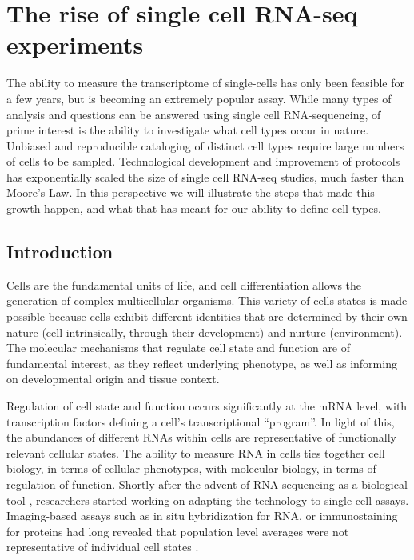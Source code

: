 
\chapter{The rise of single cell RNA-seq experiments}

\graphicspath{{Chapter1/Figs/}}

The ability to measure the transcriptome of single-cells has only been feasible for a few years, but is becoming an extremely popular assay. While many types of analysis and questions can be answered using single cell RNA-sequencing, of prime interest is the ability to investigate what cell types occur in nature. Unbiased and reproducible cataloging of distinct cell types require large numbers of cells to be sampled. Technological development and improvement of protocols has exponentially scaled the size of single cell RNA-seq studies, much faster than Moore’s Law. In this perspective we will illustrate the steps that made this growth happen, and what that has meant for our ability to define cell types.

\section{Introduction}

Cells are the fundamental units of life, and cell differentiation allows the generation of complex multicellular organisms. This variety of cells states is made possible because cells exhibit different identities that are determined by their own nature (cell-intrinsically, through their development) and nurture (environment). The molecular mechanisms that regulate cell state and function are of fundamental interest, as they reflect underlying phenotype, as well as informing on developmental origin and tissue context.

Regulation of cell state and function occurs significantly at the mRNA level, with transcription factors defining a cell’s transcriptional “program”. In light of this, the abundances of different RNAs within cells are representative of functionally relevant cellular states. The ability to measure RNA in cells ties together cell biology, in terms of cellular phenotypes, with molecular biology, in terms of regulation of function. Shortly after the advent of RNA sequencing as a biological tool \cite{Mortazavi2008-rq}, researchers started working on adapting the technology to single cell assays. Imaging-based assays such as in situ hybridization for RNA, or immunostaining for proteins had long revealed that population level averages were not representative of individual cell states \cite{Raj2008-wj}.

